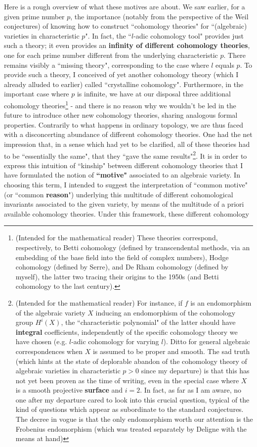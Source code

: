 Here is a rough overview of what these motives are about. We saw earlier, for a given prime number $p$, the importance (notably from the perspective of the Weil conjectures) of knowing how to construct ``cohomology theories" for ``(algebraic) varieties in characteristic $p$". In fact, the ``$l$-adic cohomology tool" provides just such a theory; it even provides an \textbf{infinity of different cohomology theories}, one for each prime number different from the underlying characteristic $p$. There remains visibly a ``missing theory", corresponding to the case where $l$ equals $p$. To provide such a theory, I conceived of yet another cohomology theory (which I already alluded to earlier) called ``crystalline cohomology". Furthermore, in the important case where $p$ is infinite, we have at our disposal three additional cohomology theories\footnote{(Intended for the mathematical reader) These theories correspond, respectively, to Betti cohomology (defined by transcendental methods, via an embedding of the base field into the field of complex numbers), Hodge cohomology (defined by Serre), and De Rham cohomology (defined by myself), the latter two tracing their origins to the 1950s (and Betti cohomology to the last century).} - and there is no reason why we wouldn't be led in the future to introduce other new cohomology theories, sharing analogous formal properties. Contrarily to what happens in ordinary topology, we are thus faced with a disconcerting abundance of different cohomology theories. One had the net impression that, in a sense which had yet to be clarified, all of these theories had to be ``essentially the same", that they ``gave the same results"\footnote{(Intended for the mathematical reader) For instance, if $f$ is an endomorphism of the algebraic variety $X$ inducing an endomorphism of the cohomology group $H^i(X)$, the ``characteristic polynomial" of the latter should have \textbf{integral} coefficients, independently of the specific cohomology theory we have chosen (e.g. $l$-adic cohomology for varying $l$). Ditto for general algebraic correspondences when $X$ is assumed to be proper and smooth. The sad truth (which hints at the state of deplorable abandon of the cohomology theory of algebraic varieties in characteristic $p > 0$ since my departure) is that this has not yet been proven as the time of writing, even in the special case where $X$ is a smooth projective \textbf{surface} and $i=2$. In fact, as far as I am aware, no one after my departure cared to look into this crucial question, typical of the kind of questions which appear as subordinate to the standard conjectures. The decree in vogue is that the only endomorphism worth our attention is the Frobenius endomorphism (which was treated separately by Deligne with the means at hand)}. It is in order to express this intuition of ``kinship" between different cohomology theories that I have formulated the notion of \textbf{``motive"} associated to an algebraic variety. In choosing this term, I intended to suggest the interpretation of ``common motive" (or ``common \textbf{reason}") underlying this multitude of different cohomological invariants associated to the given variety, by means of the multitude of a priori available cohomology theories. Under this framework, these different cohomology 